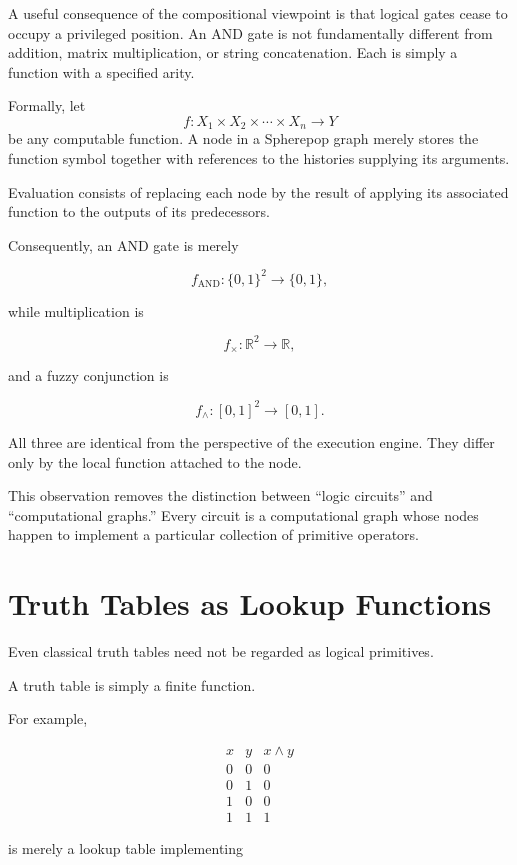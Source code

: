 \documentclass[12pt,oneside]{article}
\begin{document}
A useful consequence of the compositional viewpoint is that logical gates cease to occupy a privileged position. An AND gate is not fundamentally different from addition, matrix multiplication, or string concatenation. Each is simply a function with a specified arity.

Formally, let
\[
f : X_1 \times X_2 \times \cdots \times X_n \rightarrow Y
\]
be any computable function. A node in a Spherepop graph merely stores the function symbol together with references to the histories supplying its arguments.

Evaluation consists of replacing each node by the result of applying its associated function to the outputs of its predecessors.

Consequently, an AND gate is merely

\[
f_{\mathrm{AND}} : \{0,1\}^2 \rightarrow \{0,1\},
\]

while multiplication is

\[
f_{\times} : \mathbb{R}^2 \rightarrow \mathbb{R},
\]

and a fuzzy conjunction is

\[
f_{\wedge} : [0,1]^2 \rightarrow [0,1].
\]

All three are identical from the perspective of the execution engine. They differ only by the local function attached to the node.

This observation removes the distinction between ``logic circuits'' and ``computational graphs.'' Every circuit is a computational graph whose nodes happen to implement a particular collection of primitive operators.

\section{Truth Tables as Lookup Functions}

Even classical truth tables need not be regarded as logical primitives.

A truth table is simply a finite function.

For example,

\[
\begin{array}{cc|c}
x&y&x\land y\\
0&0&0\\
0&1&0\\
1&0&0\\
1&1&1
\end{array}
\]

is merely a lookup table implementing
\end{document}
